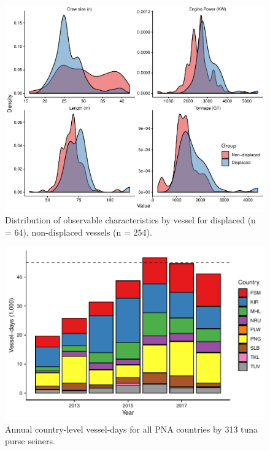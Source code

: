 \documentclass[12pt]{article}
\begin{document}
\begin{figure}
\centering
\includegraphics{img/balance_density_plot.pdf}
\caption{\label{fig:balance_density_plot}Distribution of observable characteristics by vessel for displaced (n = 64), non-displaced vessels (n = 254).}
\end{figure}

\begin{figure}
\centering
	\includegraphics{img/all_PS_VDS_cty_year.pdf}
	\caption{\label{fig:all_PS_VDS_cty_year}Annual country-level vessel-days for all PNA countries by 313 tuna purse seiners.}
\end{figure}
\end{document}
